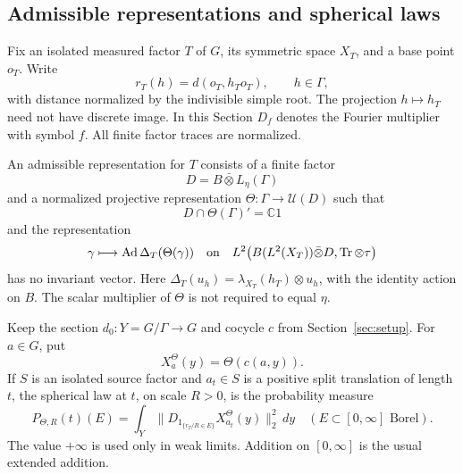 \subsection{Admissible representations and spherical laws}

Fix an isolated measured factor \(T\) of \(G\), its symmetric space
\(X_T\), and a base point \(o_T\).  Write
\[
 r_T(h)=d(o_T,h_T o_T),\qquad h\in\Gamma,
\]
with distance normalized by the indivisible simple root.  The
projection \(h\mapsto h_T\) need not have discrete image.  In this
Section \(D_f\) denotes the Fourier multiplier with symbol \(f\).
All finite factor traces are normalized.

\begin{definition}\label{def:ray-admissible}
An admissible representation for \(T\) consists of a finite factor
\[
 D=B\bar\otimes L_\eta(\Gamma)
\]
and a normalized projective representation
\(\Theta:\Gamma\to\mathcal U(D)\) such that
\[
 D\cap\Theta(\Gamma)'=\mathbb C1
\]
and the representation
\begin{equation}
 \gamma\longmapsto\operatorname{Ad}\Delta_T(\Theta(\gamma))
 \quad\hbox{on}\quad
 L^2\bigl(B(L^2(X_T))\bar\otimes D,\operatorname{Tr}\otimes\tau\bigr)
 \label{eq:ray-amplified-action}
\end{equation}
has no invariant vector.  Here
\(\Delta_T(u_h)=\lambda_{X_T}(h_T)\otimes u_h\), with the identity
action on \(B\).  The scalar multiplier of \(\Theta\) is not required
to equal \(\eta\).
\end{definition}

Keep the section \(d_0:Y=G/\Gamma\to G\) and cocycle \(c\) from
Section~\ref{sec:setup}.  For \(a\in G\), put
\[
 X^\Theta_a(y)=\Theta(c(a,y)).
\]
If \(S\) is an isolated source factor and \(a_t\in S\) is a positive
split translation of length \(t\), the spherical law at \(t\), on
scale \(R>0\), is the probability measure
\begin{equation}
 P_{\Theta,R}(t)(E)=
 \int_Y\bigl\|D_{1_{\{r_T/R\in E\}}}X^\Theta_{a_t}(y)\bigr\|_2^2\,dy
 \quad (E\subset[0,\infty]\text{ Borel}).
 \label{eq:ray-spherical-law}
\end{equation}
The value \(+\infty\) is used only in weak limits.  Addition on
\([0,\infty]\) is the usual extended addition.

